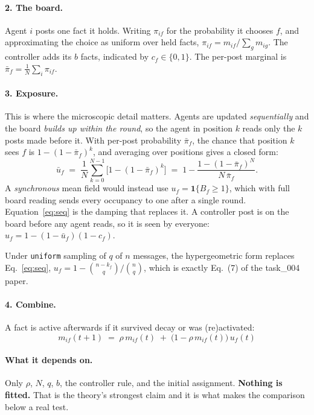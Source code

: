 \documentclass[11pt,a4paper]{article}
\begin{document}
\paragraph{2. The board.} Agent $i$ posts one fact it holds. Writing $\pi_{if}$
for the probability it chooses $f$, and approximating the choice as uniform over
held facts, $\pi_{if} = m_{if}/\sum_g m_{ig}$. The controller adds its $b$ facts,
indicated by $c_f \in \{0,1\}$. The per-post marginal is
$\bar\pi_f = \frac1N\sum_i \pi_{if}$.

\paragraph{3. Exposure.} This is where the microscopic detail matters. Agents
are updated \emph{sequentially} and the board \emph{builds up within the round},
so the agent in position $k$ reads only the $k$ posts made before it. With
per-post probability $\bar\pi_f$, the chance that position $k$ sees $f$ is
$1-(1-\bar\pi_f)^k$, and averaging over positions gives a closed form:
\begin{equation}
\bar u_f \;=\; \frac1N\sum_{k=0}^{N-1}\Big[1-(1-\bar\pi_f)^k\Big]
\;=\; 1-\frac{1-(1-\bar\pi_f)^N}{N\,\bar\pi_f}.
\label{eq:seq}
\end{equation}
A \emph{synchronous} mean field would instead use $u_f = \mathbf 1\{B_f\ge 1\}$,
which with full board reading sends every occupancy to one after a single round.
Equation~\eqref{eq:seq} is the damping that replaces it. A controller post is on
the board before any agent reads, so it is seen by everyone:
$u_f = 1-(1-\bar u_f)(1-c_f)$.

Under \texttt{uniform} sampling of $q$ of $n$ messages, the hypergeometric form
replaces Eq.~\eqref{eq:seq},
$u_f = 1-\binom{n-k_f}{q}\big/\binom{n}{q}$, which is exactly Eq.~(7) of the
task\_004 paper.

\paragraph{4. Combine.} A fact is active afterwards if it survived decay or was
(re)activated:
\begin{equation}
\boxed{\;m_{if}(t+1) \;=\; \rho\,m_{if}(t) \;+\; \big(1-\rho\,m_{if}(t)\big)\,u_f(t)\;}
\label{eq:map}
\end{equation}

\paragraph{What it depends on.} Only $\rho$, $N$, $q$, $b$, the controller rule,
and the initial assignment. \textbf{Nothing is fitted.} That is the theory's
strongest claim and it is what makes the comparison below a real test.
\end{document}
